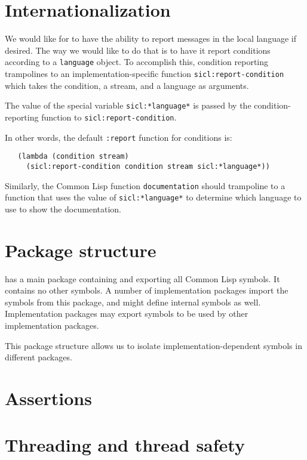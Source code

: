 \section{Internationalization}

We would like for {\sysname} to have the ability to report messages in
the local language if desired.  The way we would like to do that is to
have it report conditions according to a \texttt{language} object.  To
accomplish this, condition reporting trampolines to an
implementation-specific function \texttt{sicl:report-condition} which
takes the condition, a stream, and a language as arguments.

The value of the special variable \texttt{sicl:*language*} is passed
by the condition-reporting function to \texttt{sicl:report-condition}.

In other words, the default \texttt{:report} function for conditions is:

\begin{verbatim}
   (lambda (condition stream)
     (sicl:report-condition condition stream sicl:*language*))
\end{verbatim}

Similarly, the Common Lisp function \texttt{documentation} should
trampoline to a function that uses the value of
\texttt{sicl:*language*} to determine which language to use to show
the documentation.

\section{Package structure}

{\sysname} has a main package containing and exporting all Common Lisp
symbols.  It contains no other symbols.  A number of implementation
packages import the symbols from this package, and might define
internal symbols as well.  Implementation packages may export symbols
to be used by other implementation packages.

This package structure allows us to isolate implementation-dependent
symbols in different packages.

\section{Assertions}

\section{Threading and thread safety}

